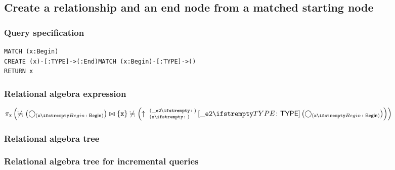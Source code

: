 \subsection{Create a relationship and an end node from a matched starting node}

\subsubsection*{Query specification}

\begin{lstlisting}
MATCH (x:Begin)
CREATE (x)-[:TYPE]->(:End)MATCH (x:Begin)-[:TYPE]->()
RETURN x
\end{lstlisting}

\subsubsection*{Relational algebra expression}

$\projection{\var{x}} \left(\alldifferent{} \left(\getvertices{x}{Begin}\right) \join \{\var{x}\} \alldifferent{} \left(\expandout{x}{\_e2}{}{\_e2}{TYPE} \left(\getvertices{x}{Begin}\right)\right)\right)$

\subsubsection*{Relational algebra tree}


\subsubsection*{Relational algebra tree for incremental queries}

